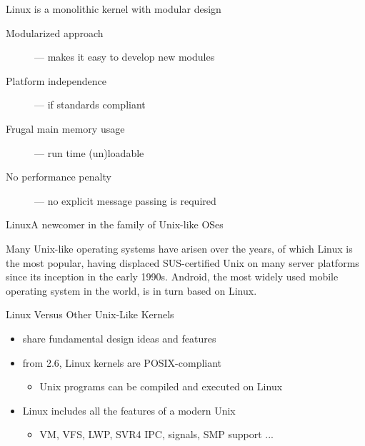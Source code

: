 \begin{frame}
  \begin{block}{Linux is a monolithic kernel with modular design}
    \begin{description}
    \item[Modularized approach] --- makes it easy to develop new modules
    \item[Platform independence] --- if standards compliant
    \item[Frugal main memory usage] --- run time (un)loadable
    \item[No performance penalty] --- no explicit message passing is required
    \end{description}
  \end{block}
\end{frame}

\begin{frame}{Linux}{A newcomer in the family of Unix-like OSes}
  \begin{center}
  \end{center}
\end{frame}

Many Unix-like operating systems have arisen over the years, of which
Linux is the most popular, having displaced SUS-certified Unix on many server platforms
since its inception in the early 1990s. Android, the most widely used mobile operating
system in the world, is in turn based on Linux.

\begin{frame}
  \begin{block}{Linux Versus Other Unix-Like Kernels}
    \begin{itemize}
    \item share fundamental design ideas and features
    \item from 2.6, Linux kernels are POSIX-compliant
      \begin{itemize}
      \item Unix programs can be compiled and executed on Linux
      \end{itemize}
    \item Linux includes all the features of a modern Unix
      \begin{itemize}
      \item VM, VFS, LWP, SVR4 IPC, signals, SMP support ...
      \end{itemize}
    \end{itemize}
  \end{block}
\end{frame}


